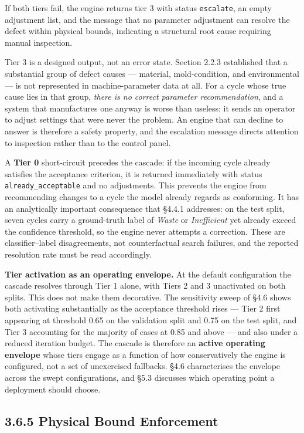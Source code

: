 If both tiers fail, the engine returns tier 3 with status \texttt{escalate}, an empty adjustment list, and the message that no parameter adjustment can resolve the defect within physical bounds, indicating a structural root cause requiring manual inspection.

Tier 3 is a designed output, not an error state. Section 2.2.3 established that a substantial group of defect causes --- material, mold-condition, and environmental --- is not represented in machine-parameter data at all. For a cycle whose true cause lies in that group, \emph{there is no correct parameter recommendation}, and a system that manufactures one anyway is worse than useless: it sends an operator to adjust settings that were never the problem. An engine that can decline to answer is therefore a safety property, and the escalation message directs attention to inspection rather than to the control panel.

A \textbf{Tier 0} short-circuit precedes the cascade: if the incoming cycle already satisfies the acceptance criterion, it is returned immediately with status \texttt{already\_acceptable} and no adjustments. This prevents the engine from recommending changes to a cycle the model already regards as conforming. It has an analytically important consequence that §4.4.1 addresses: on the test split, seven cycles carry a ground-truth label of \emph{Waste} or \emph{Inefficient} yet already exceed the confidence threshold, so the engine never attempts a correction. These are classifier--label disagreements, not counterfactual search failures, and the reported resolution rate must be read accordingly.

\textbf{Tier activation as an operating envelope.} At the default configuration the cascade resolves through Tier 1 alone, with Tiers 2 and 3 unactivated on both splits. This does not make them decorative. The sensitivity sweep of §4.6 shows both activating substantially as the acceptance threshold rises --- Tier 2 first appearing at threshold 0.65 on the validation split and 0.75 on the test split, and Tier 3 accounting for the majority of cases at 0.85 and above --- and also under a reduced iteration budget. The cascade is therefore an \textbf{active operating envelope} whose tiers engage as a function of how conservatively the engine is configured, not a set of unexercised fallbacks. §4.6 characterises the envelope across the swept configurations, and §5.3 discusses which operating point a deployment should choose.

\hypertarget{physical-bound-enforcement}{%
\subsection{3.6.5 Physical Bound Enforcement}\label{physical-bound-enforcement}}

